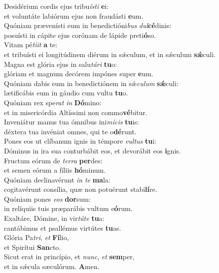 \evenverse Desidérium cordis ejus tribu\textit{í}\textit{sti} \textbf{e}i:~\*\\
\evenverse et voluntáte labiórum ejus non fraudásti \textbf{e}um.\\
\oddverse Quóniam prævenísti eum in benedictióni\textit{bus} \textit{dul}\textbf{cé}dinis:~\*\\
\oddverse posuísti in cápite ejus corónam de lápide preti\textbf{ó}so.\\
\evenverse Vitam pé\textit{ti}\textit{it} \textbf{a} te:~\*\\
\evenverse et tribuísti ei longitúdinem diérum in sǽculum, et in sǽculum \textbf{sǽ}culi.\\
\oddverse Magna est glória ejus in salu\textit{tá}\textit{ri} \textbf{tu}o:~\*\\
\oddverse glóriam et magnum decórem impónes super \textbf{e}um.\\
\evenverse Quóniam dabis eum in benedictiónem in sǽ\textit{cu}\textit{lum} \textbf{sǽ}culi:~\*\\
\evenverse lætificábis eum in gáudio cum vultu \textbf{tu}o.\\
\oddverse Quóniam rex spe\textit{rat} \textit{in} \textbf{Dó}mino:~\*\\
\oddverse et in misericórdia Altíssimi non commo\textbf{vé}bitur.\\
\evenverse Inveniátur manus tua ómnibus ini\textit{mí}\textit{cis} \textbf{tu}is:~\*\\
\evenverse déxtera tua invéniat omnes, qui te o\textbf{dé}runt.\\
\oddverse Pones eos ut clíbanum ignis in témpore \textit{vul}\textit{tus} \textbf{tu}i:~\*\\
\oddverse Dóminus in ira sua conturbábit eos, et devorábit eos \textbf{i}gnis.\\
\evenverse Fructum eórum de \textit{ter}\textit{ra} \textbf{per}des:~\*\\
\evenverse et semen eórum a fíliis \textbf{hó}minum.\\
\oddverse Quóniam declinavérunt \textit{in} \textit{te} \textbf{ma}la:~\*\\
\oddverse cogitavérunt consília, quæ non potuérunt stabi\textbf{lí}re.\\
\evenverse Quóniam pones \textit{e}\textit{os} \textbf{dor}sum:~\*\\
\evenverse in relíquiis tuis præparábis vultum e\textbf{ó}rum.\\
\oddverse Exaltáre, Dómine, in vir\textit{tú}\textit{te} \textbf{tu}a:~\*\\
\oddverse cantábimus et psallémus virtútes \textbf{tu}as.\\
\evenverse Glória Pa\textit{tri}, \textit{et} \textbf{Fí}lio,~\*\\
\evenverse et Spirítui \textbf{San}cto.\\
\oddverse Sicut erat in princípio, et \textit{nunc}, \textit{et} \textbf{sem}per,~\*\\
\oddverse et in sǽcula sæculórum. \textbf{A}men.\\
